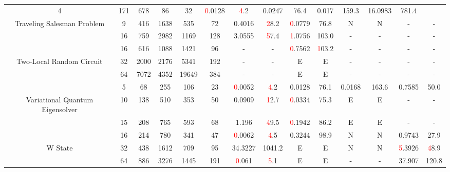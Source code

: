 \begin{table}[htb]
{\begin{tabular}{|c|c|c|c|c|c|c|c|c|c|c|c|c|c|}
4 & 171 & 678 & 86 & 32
 & \textcolor{red}0.0128 & \textcolor{red}4.2
 & 0.0247 & 76.4
 & 0.017 & 159.3
 & 16.0983 & 781.4
 \\
Traveling Salesman Problem & 
9 & 416 & 1638 & 535 & 72
 & 0.4016 & \textcolor{red}28.2
 & \textcolor{red}0.0779 & 76.8
 & N & N 
 & - & -
 \\
 & 
16 & 759 & 2982 & 1169 & 128
 & 3.0555 & \textcolor{red}57.4
 & \textcolor{red}1.0756 & 103.0
 & - & -
 & - & -
 \\
\hline
 & 
16 & 616 & 1088 & 1421 & 96
 & - & -
 & \textcolor{red}0.7562 & \textcolor{red}103.2
 & - & -
 & - & -
 \\
Two-Local Random Circuit & 
32 & 2000 & 2176 & 5341 & 192
 & - & -
 & E & E
 & - & -
 & - & -
 \\
 & 
64 & 7072 & 4352 & 19649 & 384
 & - & -
 & E & E
 & - & -
 & - & -
 \\
\hline
 & 
5 & 68 & 255 & 106 & 23
 & \textcolor{red}0.0052 & \textcolor{red}4.2
 & 0.0128 & 76.1
 & 0.0168 & 163.6
 & 0.7585 & 50.0
 \\
Variational Quantum Eigensolver & 
10 & 138 & 510 & 353 & 50
 & 0.0909 & \textcolor{red}12.7
 & \textcolor{red}0.0334 & 75.3
 & E & E
 & - & -
 \\
 & 
15 & 208 & 765 & 593 & 68
 & 1.196 & \textcolor{red}49.5
 & \textcolor{red}0.1942 & 86.2
 & E & E
 & - & -
 \\
\hline
 & 
16 & 214 & 780 & 341 & 47
 & \textcolor{red}0.0062 & \textcolor{red}4.5
 & 0.3244 & 98.9
 & N & N 
 & 0.9743 & 27.9
 \\
W State & 
32 & 438 & 1612 & 709 & 95
 & 34.3227 & 1041.2
 & E & E
 & N & N 
 & \textcolor{red}5.3926 & \textcolor{red}48.9
 \\
 & 
64 & 886 & 3276 & 1445 & 191
 & \textcolor{red}0.061 & \textcolor{red}5.1
 & E & E
 & - & -
 & 37.907 & 120.8
 \\
\hline
\end{tabular}}
\end{table}